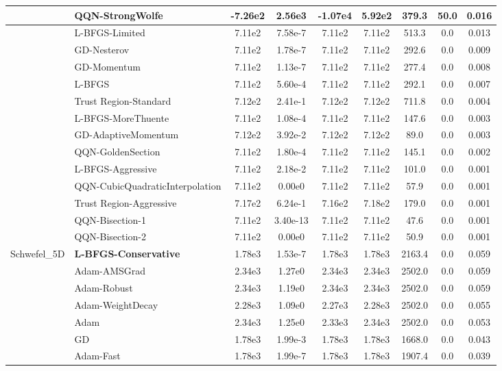 \documentclass[10pt]{article}
\begin{document}
\begin{longtable}{|l|l|c|c|c|c|c|c|c|}
\hline
 & QQN-StrongWolfe & -7.26e2 & 2.56e3 & -1.07e4 & 5.92e2 & 379.3 & 50.0 & 0.016 \\
\hline
 & L-BFGS-Limited & 7.11e2 & 7.58e-7 & 7.11e2 & 7.11e2 & 513.3 & 0.0 & 0.013 \\
\hline
 & GD-Nesterov & 7.11e2 & 1.78e-7 & 7.11e2 & 7.11e2 & 292.6 & 0.0 & 0.009 \\
\hline
 & GD-Momentum & 7.11e2 & 1.13e-7 & 7.11e2 & 7.11e2 & 277.4 & 0.0 & 0.008 \\
\hline
 & L-BFGS & 7.11e2 & 5.60e-4 & 7.11e2 & 7.11e2 & 292.1 & 0.0 & 0.007 \\
\hline
 & Trust Region-Standard & 7.12e2 & 2.41e-1 & 7.12e2 & 7.12e2 & 711.8 & 0.0 & 0.004 \\
\hline
 & L-BFGS-MoreThuente & 7.11e2 & 1.08e-4 & 7.11e2 & 7.11e2 & 147.6 & 0.0 & 0.003 \\
\hline
 & GD-AdaptiveMomentum & 7.12e2 & 3.92e-2 & 7.12e2 & 7.12e2 & 89.0 & 0.0 & 0.003 \\
\hline
 & QQN-GoldenSection & 7.11e2 & 1.80e-4 & 7.11e2 & 7.11e2 & 145.1 & 0.0 & 0.002 \\
\hline
 & L-BFGS-Aggressive & 7.11e2 & 2.18e-2 & 7.11e2 & 7.11e2 & 101.0 & 0.0 & 0.001 \\
\hline
 & QQN-CubicQuadraticInterpolation & 7.11e2 & 0.00e0 & 7.11e2 & 7.11e2 & 57.9 & 0.0 & 0.001 \\
\hline
 & Trust Region-Aggressive & 7.17e2 & 6.24e-1 & 7.16e2 & 7.18e2 & 179.0 & 0.0 & 0.001 \\
\hline
 & QQN-Bisection-1 & 7.11e2 & 3.40e-13 & 7.11e2 & 7.11e2 & 47.6 & 0.0 & 0.001 \\
\hline
 & QQN-Bisection-2 & 7.11e2 & 0.00e0 & 7.11e2 & 7.11e2 & 50.9 & 0.0 & 0.001 \\
Schwefel\_5D & \textbf{L-BFGS-Conservative} & 1.78e3 & 1.53e-7 & 1.78e3 & 1.78e3 & 2163.4 & 0.0 & 0.059 \\
\hline
 & Adam-AMSGrad & 2.34e3 & 1.27e0 & 2.34e3 & 2.34e3 & 2502.0 & 0.0 & 0.059 \\
\hline
 & Adam-Robust & 2.34e3 & 1.19e0 & 2.34e3 & 2.34e3 & 2502.0 & 0.0 & 0.059 \\
\hline
 & Adam-WeightDecay & 2.28e3 & 1.09e0 & 2.27e3 & 2.28e3 & 2502.0 & 0.0 & 0.055 \\
\hline
 & Adam & 2.34e3 & 1.25e0 & 2.33e3 & 2.34e3 & 2502.0 & 0.0 & 0.053 \\
\hline
 & GD & 1.78e3 & 1.99e-3 & 1.78e3 & 1.78e3 & 1668.0 & 0.0 & 0.043 \\
\hline
 & Adam-Fast & 1.78e3 & 1.99e-7 & 1.78e3 & 1.78e3 & 1907.4 & 0.0 & 0.039 \\

\end{longtable}
\end{document}
